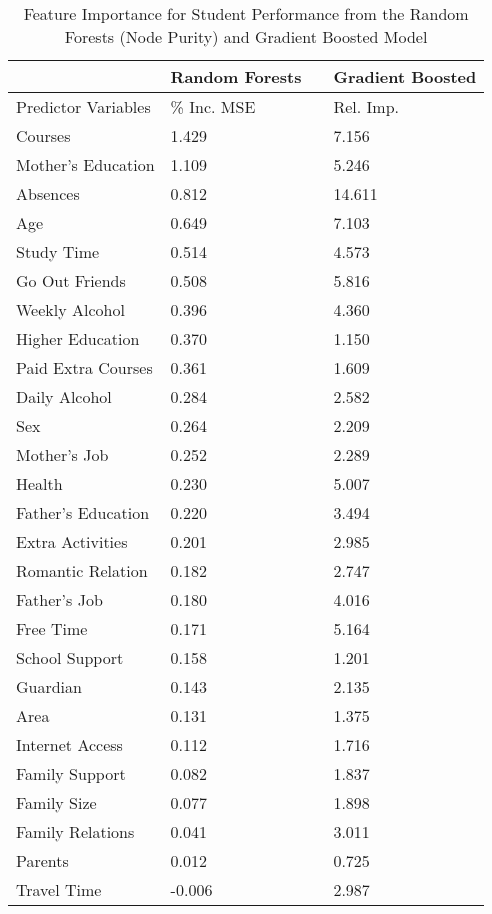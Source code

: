 \documentclass[sigconf]{acmart}
\begin{document}

\begin{table}
  \caption{Feature Importance for Student Performance from the Random Forests 
  (Node Purity) and Gradient Boosted Model}
  \label{tab:freq}
  \begin{tabular}{llll}
    \toprule
            & Random  Forests & & Gradient Boosted \\    
    \midrule   
    
    Predictor Variables & \% Inc. MSE & & Rel. Imp. \\    
    \midrule
    Courses             &  1.429 &   &  7.156 \\ 
    Mother's Education  &  1.109 &   &  5.246 \\
    Absences            &  0.812 &   & 14.611 \\
    Age                 &  0.649 &   &  7.103 \\
    Study Time          &  0.514 &   &  4.573 \\     
    Go Out Friends      &  0.508 &   &  5.816 \\
    Weekly Alcohol      &  0.396 &   &  4.360 \\
    Higher Education    &  0.370 &   &  1.150 \\   
    Paid Extra Courses  &  0.361 &   &  1.609 \\
    Daily Alcohol       &  0.284 &   &  2.582 \\
    Sex                 &  0.264 &   &  2.209 \\
    Mother's Job        &  0.252 &   &  2.289 \\   
    Health              &  0.230 &   &  5.007 \\ 
    Father's Education  &  0.220 &   &  3.494 \\   
    Extra Activities    &  0.201 &   &  2.985 \\
    Romantic Relation   &  0.182 &   &  2.747 \\
    Father's Job        &  0.180 &   &  4.016 \\   
    Free Time           &  0.171 &   &  5.164 \\
    School Support      &  0.158 &   &  1.201 \\    
    Guardian            &  0.143 &   &  2.135 \\
    Area                &  0.131 &   &  1.375 \\
    Internet Access     &  0.112 &   &  1.716 \\    
    Family Support      &  0.082 &   &  1.837 \\
    Family Size         &  0.077 &   &  1.898 \\
    Family Relations    &  0.041 &   &  3.011 \\
    Parents             &  0.012 &   &  0.725 \\
    Travel Time         & -0.006 &   &  2.987 \\  
    \bottomrule
  \end{tabular}
\end{table}
\end{document}
